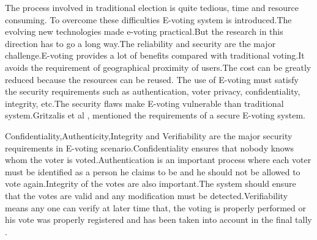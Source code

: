 \documentclass[conference]{IEEEtran}
\begin{document}
The  process involved in traditional election is quite tedious, time and resource consuming. To overcome these difficulties E-voting system  is introduced.The evolving new technologies made e-voting practical.But the research in this direction has to go a long way.The reliability and security are the major challenge.E-voting provides a lot of benefits compared with traditional voting.It avoids the requirement of geographical proximity of users.The cost can be greatly reduced because the resources can be reused. The use of E-voting must satisfy the security requirements such as authentication, voter privacy, confidentiality, integrity, etc.The security flaws make E-voting vulnerable than traditional system.Gritzalis et al \cite{gritzalis2002principles},\cite{gritzalis2003secure} mentioned the requirements of a secure E-voting system.

Confidentiality,Authenticity,Integrity and Verifiability are the major security requirements in E-voting scenario.Confidentiality ensures that nobody knows whom the voter is voted.Authentication is an important process where each voter must be identified as a person he claims to be and he should not be allowed to vote again.Integrity of the votes are also important.The system should ensure that the votes are valid and any modification must be detected.Verifiability means any one can verify at later time that, the voting is properly performed or his vote was properly registered and has been taken into account in the final tally \cite{fujioka1993practical}.
\end{document}
